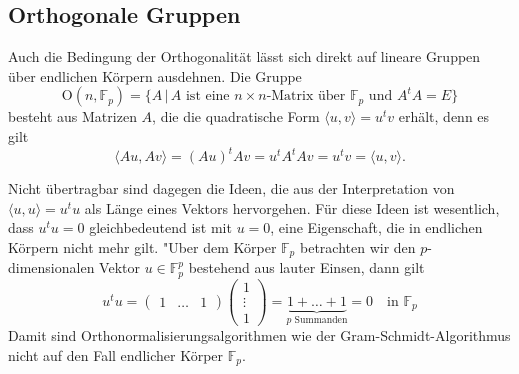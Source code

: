\subsection{Orthogonale Gruppen}
Auch die Bedingung der Orthogonalität lässt sich direkt auf lineare
Gruppen über endlichen Körpern ausdehnen.
Die Gruppe
\[
\textrm{O}(n,\mathbb F_p)
=
\{
A\,|\,
\text{$A$ ist eine $n\times n$-Matrix über $\mathbb F_p$ und $A^tA=E$}
\}
\]
besteht aus Matrizen $A$, die die quadratische Form
$
\langle u,v\rangle
=
u^tv
$
erhält, denn es gilt
\[
\langle Au,Av\rangle
=
(Au)^t Av
=
u^tA^tAv
=
u^tv
=
\langle u,v\rangle.
\]

Nicht übertragbar sind dagegen die Ideen, die aus der Interpretation
von $\langle u,u\rangle=u^tu$ als Länge eines Vektors hervorgehen.
Für diese Ideen ist wesentlich, dass $u^tu=0$ gleichbedeutend ist
mit $u=0$, eine Eigenschaft, die in endlichen Körpern nicht mehr gilt.
"Uber dem Körper $\mathbb F_p$ betrachten wir den $p$-dimensionalen
Vektor $u\in\mathbb F_p^p$ bestehend aus lauter Einsen, dann gilt
\[
u^tu
=
\begin{pmatrix}1&\dots&1\end{pmatrix}
\begin{pmatrix}1\\\vdots\\1\end{pmatrix}
=
\underbrace{1+\dots+1}_{\text{$p$ Summanden}}=0\quad\text{in $\mathbb F_p$}
\]
Damit sind Orthonormalisierungsalgorithmen wie der Gram-Schmidt-Algorithmus
nicht auf den Fall endlicher Körper $\mathbb F_p$.

